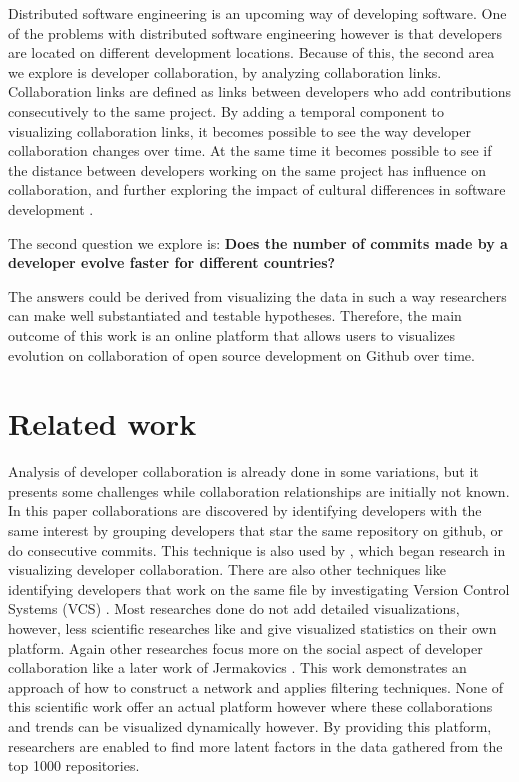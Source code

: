 \documentclass[acmtog, authorversion]{acmart}
\begin{document}
Distributed software engineering is an upcoming way of developing software.
One of the problems with distributed software engineering however is that developers are located on different development locations. 
Because of this, the second area we explore is developer collaboration, by analyzing collaboration links.
Collaboration links are defined as links between developers who add contributions consecutively to the same project.
By adding a temporal component to visualizing collaboration links, it becomes possible to see the way developer collaboration changes over time.
At the same time it becomes possible to see if the distance between developers working on the same project has influence on collaboration, and further exploring the impact of cultural differences in software development \cite{Mishra2014}.

The second question we explore is: \textbf{Does the number of commits made by a developer evolve faster for different countries?}

The answers could be derived from visualizing the data in such a way researchers can make well substantiated and testable hypotheses.
Therefore, the main outcome of this work is an online platform that allows users to visualizes evolution on collaboration of open source development on Github over time.

\section{Related work}
Analysis of developer collaboration is already done in some variations, but it presents some challenges while collaboration relationships are initially not known. 
In this paper collaborations are discovered by identifying developers with the same interest by grouping developers that star the same repository on github, or do consecutive commits.
This technique is also used by \cite{Heller}, which began research in visualizing developer collaboration. 
There are also other techniques like identifying developers that work on the same file by investigating Version Control Systems (VCS) \cite{Jermakovics2013}.
Most researches done do not add detailed visualizations, however, less scientific researches like \cite{GHOctoverse} and \cite{StackOverflow2017} give visualized statistics on their own platform.
Again other researches focus more on the social aspect of developer collaboration like a later work of Jermakovics \cite{Jermakovics2011}.
This work demonstrates an approach of how to construct a network and applies filtering techniques.
None of this scientific work offer an actual platform however where these collaborations and trends can be visualized dynamically however. By providing this platform, researchers are enabled to find more latent factors in the data gathered from the  top 1000 repositories.
\end{document}
